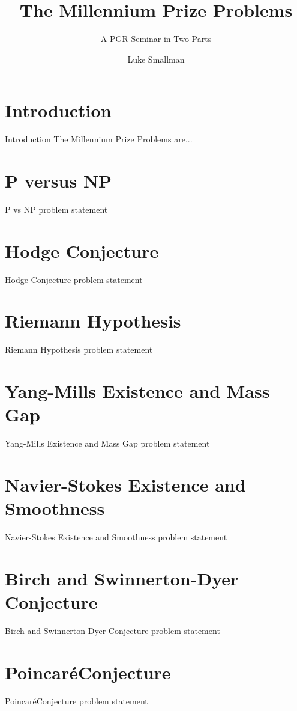 \documentclass{beamer}
\title{The Millennium Prize Problems}
\subtitle{A PGR Seminar in Two Parts}
\date{}
\author{Luke Smallman}
\institute{Cardiff University}
\newcommand{\Poincare}{Poincar\'{e}}
\begin{document}
  \maketitle
  \section{Introduction}
  \begin{frame}{Introduction}
    The Millennium Prize Problems are...
  \end{frame}

  \section{P versus NP}
  \begin{frame}{P vs NP}
      problem statement
  \end{frame}

  \section{Hodge Conjecture}
  \begin{frame}{Hodge Conjecture}
      problem statement
  \end{frame}

  \section{Riemann Hypothesis}
  \begin{frame}{Riemann Hypothesis}
      problem statement
  \end{frame}

  \section{Yang-Mills Existence and Mass Gap}
  \begin{frame}{Yang-Mills Existence and Mass Gap}
      problem statement
  \end{frame}

  \section{Navier-Stokes Existence and Smoothness}
  \begin{frame}{Navier-Stokes Existence and Smoothness}
      problem statement
  \end{frame}

  \section{Birch and Swinnerton-Dyer Conjecture}
  \begin{frame}{Birch and Swinnerton-Dyer Conjecture}
      problem statement
  \end{frame}

  \section{\Poincare Conjecture}
  \begin{frame}{\Poincare Conjecture}
      problem statement
  \end{frame}
\end{document}
